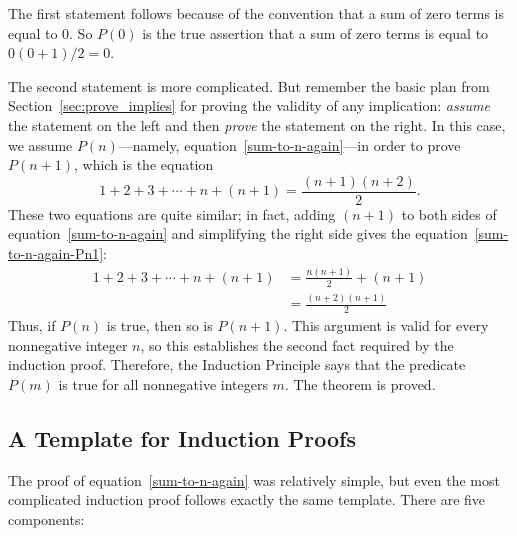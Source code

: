 The first statement follows because of the convention that a sum of
zero terms is equal to 0.  So $P(0)$ is the true assertion that a sum
of zero terms is equal to $0(0+1)/2 = 0$.

The second statement is more complicated.  But remember the basic
plan from Section~\ref{sec:prove_implies} for proving the validity of
any implication: \emph{assume} the statement on the left and then
\emph{prove} the statement on the right.  In this case, we assume
$P(n)$---namely, equation~\eqref{sum-to-n-again}---in order to prove
$P(n+1)$, which is the equation
\begin{equation}\label{sum-to-n-again-Pn1}
1 + 2 + 3 + \cdots + n + (n+1) = \frac{(n+1)(n+2)}{2}.
\end{equation}
These two equations are quite similar; in fact, adding $(n+1)$ to both
sides of equation~\eqref{sum-to-n-again} and simplifying the right side 
gives the equation~\eqref{sum-to-n-again-Pn1}:
\begin{align*}
1 + 2 + 3 + \cdots + n + (n+1)
    & = \frac{n(n+1)}{2} + (n+1) \\
    & = \frac{(n+2)(n+1)}{2}
\end{align*}
Thus, if $P(n)$ is true, then so is $P(n+1)$.  This argument is valid
for every nonnegative integer $n$, so this establishes the second fact
required by the induction proof.  Therefore, the Induction Principle
says that the predicate $P(m)$ is true for all nonnegative integers
$m$.  The theorem is proved.

\iffalse
In effect, we've just proved
that $P(0)$ implies $P(1)$, $P(1)$ implies $P(2)$, $P(2)$ implies
$P(3),\dots$, all in one fell swoop.
\fi

\subsection{A Template for Induction Proofs}
\label{templ-induct-proofs}

The proof of equation~\eqref{sum-to-n-again} was relatively simple,
but even the most complicated induction proof follows exactly the same
template.  There are five components:


